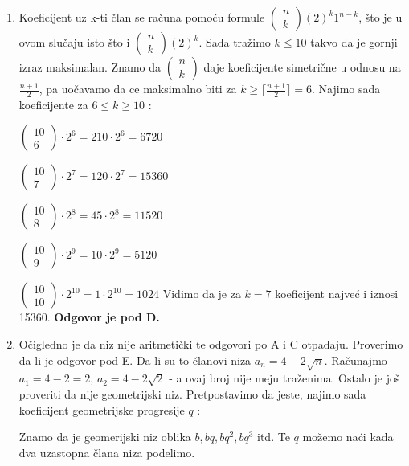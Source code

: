\documentclass[a4paper,12pt]{report}
\begin{document}
\begin{enumerate}[1.]
\item Koeficijent uz k-ti \v{c}lan se ra\v{c}una pomo\'{c}u formule $\left(\! \begin{array}{c} n \\k \end{array} \!\right) (2)^{k} 1^{n-k}$, \v{s}to je u ovom slu\v{c}aju isto \v{s}to i $\left(\! \begin{array}{c} n \\k \end{array} \!\right) (2)^{k} $. Sada tra\v{z}imo $ k \leq 10$ takvo da je gornji izraz maksimalan. Znamo da $\left(\! \begin{array}{c} n \\k \end{array} \!\right) $ daje koeficijente simetri\v{c}ne u odnosu na $\frac{n + 1}{2} $, pa uo\v{c}avamo da ce maksimalno biti za $ k \geq \lceil \frac{n + 1}{2}\rceil   = 6$. Na\d{j}imo sada koeficijente za $ 6 \leq k \geq 10$ : 
\par $\left(\! \begin{array}{c} 10 \\6 \end{array} \!\right)  \cdot 2^{6} = 210 \cdot 2^{6} = 6720 $
\par $\left(\! \begin{array}{c} 10 \\7 \end{array} \!\right)  \cdot 2^{7} = 120 \cdot 2^{7} = 15360 $
\par $\left(\! \begin{array}{c} 10 \\8 \end{array} \!\right)  \cdot 2^{8} = 45 \cdot 2^{8} =  11520$
\par $\left(\! \begin{array}{c} 10 \\9 \end{array} \!\right)  \cdot 2^{9} = 10 \cdot 2^{9} = 5120 $
\par $\left(\! \begin{array}{c} 10 \\10 \end{array} \!\right)  \cdot 2^{10} = 1 \cdot 2^{10} = 1024 $
Vidimo da je za $k = 7$ koeficijent najve\'{c} i iznosi 15360. \textbf{Odgovor je pod D.}

\item O\v{c}igledno je da niz nije aritmeti\v{c}ki te odgovori po A i C otpadaju. Proverimo da li je odgovor pod E. Da li su to \v{c}lanovi niza $a_n = 4 - 2\sqrt{n} $. Ra\v{c}unajmo $a_1 = 4-2 = 2$, $a_2 = 4 - 2\sqrt{2}$ - a ovaj broj nije me\d{j}u tra\v{z}enima. Ostalo je jo\v{s} proveriti da nije geometrijski niz. Pretpostavimo da jeste, na\d{j}imo sada koeficijent geometrijske progresije $q$ :
\par Znamo da je geomerijski niz oblika $b, bq, bq^2, bq^3$ itd. Te $q$ mo\v{z}emo na\'{c}i kada dva uzastopna \v{c}lana niza podelimo.  






\end{enumerate}
\end{document}
